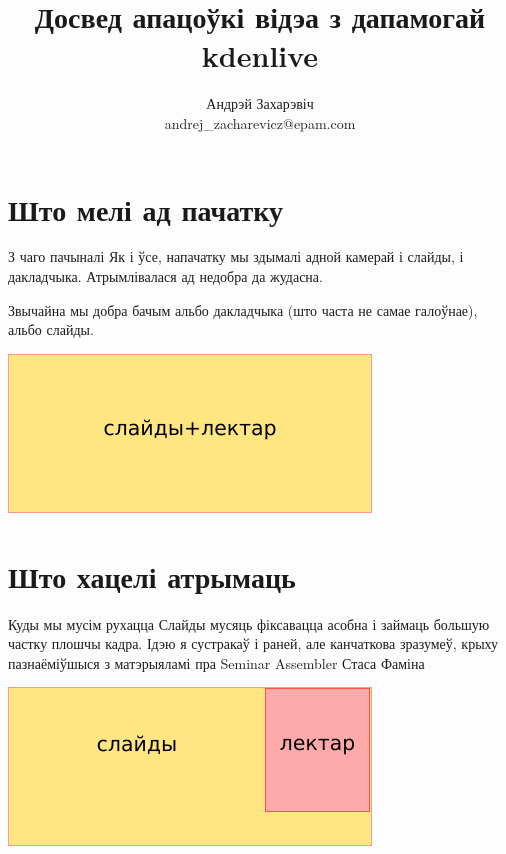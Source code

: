 \documentclass[ignorenonframetext,hyperref={pdftex,unicode}]{beamer}
\title{Досвед апацоўкі відэа з дапамогай kdenlive}
\author[Андрэй Захарэвіч]{Андрэй Захарэвіч\\ andrej\_zacharevicz@epam.com}
\begin{document}
\frame{\titlepage} 


\section{Што мелі ад пачатку} 

\begin{frame}{З чаго пачыналі} 
	Як і ўсе, напачатку мы здымалі адной камерай і слайды, і дакладчыка. Атрымлівалася ад недобра да жудасна.

	Звычайна мы добра бачым альбо дакладчыка (што часта не самае галоўнае), альбо слайды.
	\begin{center}
 		\includegraphics[height=0.5\textheight,keepaspectratio]{1}		
	\end{center}
\end{frame}

\section{Што хацелі атрымаць} 

\begin{frame}{Куды мы мусім рухацца} 
	Слайды мусяць фіксавацца асобна і займаць большую частку плошчы кадра. Ідэю я сустракаў і раней, але канчаткова зразумеў, крыху пазнаёміўшыся з матэрыяламі пра Seminar Assembler\cite{SeminarAssembler}\cite{SAsources} Стаса Фаміна
	\begin{center}
 		\includegraphics[height=0.5\textheight,keepaspectratio]{2}		
	\end{center}
\end{frame}
\end{document}
